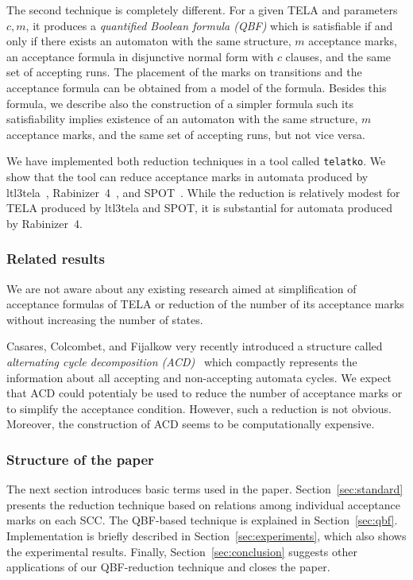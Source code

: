\documentclass[a4paper,UKenglish,cleveref, autoref, anonymous, thm-restate]{lipics-v2021}
\begin{document}
The second technique is completely different. For a given TELA and
parameters $c,m$, it produces a \emph{quantified Boolean formula
  (QBF)} which is satisfiable if and only if there exists an automaton
with the same structure, $m$ acceptance marks, an acceptance formula
in disjunctive normal form with $c$ clauses, and the same set
of accepting runs. The placement of the marks on transitions and the
acceptance formula can be obtained from a model of the
formula. Besides this formula, we describe also the construction of a
simpler formula such its satisfiability implies existence of an
automaton with the same structure, $m$ acceptance marks, and the same
set of accepting runs, but not vice versa.

We have implemented both reduction techniques in a tool called
\texttt{telatko}. We show that the tool can reduce acceptance marks in
automata produced by ltl3tela~\cite{major.19.atva},
Rabinizer~4~\cite{kretinsky.18.cav}, and SPOT~\cite{duret.16.atva2}.
While the reduction is relatively modest for TELA produced by ltl3tela
and SPOT, it is substantial for automata produced by Rabinizer~4.

\subsubsection{Related results}
We are not aware about any existing research aimed at simplification
of acceptance formulas of TELA or reduction of the number of its
acceptance marks without increasing the number of states.

Casares, Colcombet, and Fijalkow very recently introduced a structure
called \emph{alternating cycle decomposition
  (ACD)}~\cite{casares.21.icalp} which compactly represents the
information about all accepting and non-accepting automata cycles.  We
expect that ACD could potentialy be used to reduce the number of
acceptance marks or to simplify the acceptance condition. However,
such a reduction is not obvious. Moreover, the construction of ACD
seems to be computationally expensive.

\subsubsection{Structure of the paper} The next section introduces
basic terms used in the paper. Section~\ref{sec:standard} presents the
reduction technique based on relations among individual acceptance
marks on each SCC. The QBF-based technique is explained in
Section~\ref{sec:qbf}. Implementation is briefly described in
Section~\ref{sec:experiments}, which also shows the experimental
results. Finally, Section~\ref{sec:conclusion} suggests other
applications of our QBF-reduction technique and closes the paper.
\end{document}
